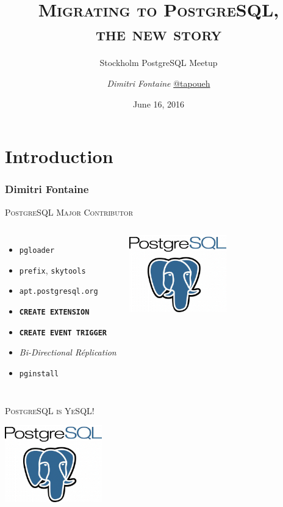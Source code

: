\documentclass{beamer}
\title{\textsc{Migrating to PostgreSQL, \\ the new story}}
\subtitle{Stockholm PostgreSQL Meetup}
\author{\textit{Dimitri Fontaine} \url{@tapoueh}}
\date{June 16, 2016}
\begin{document}
\frame{\titlepage}

\section{Introduction}

\begin{frame}[fragile]
  \frametitle{Dimitri Fontaine}

  \begin{center}
    {\Large \textsc{PostgreSQL Major Contributor}}
  \end{center}

  \begin{columns}[c]

    \begin{itemize}
    \item \texttt{pgloader}
    \item \texttt{prefix}, \texttt{skytools}
    \item \texttt{apt.postgresql.org}
    \item \texttt{\textbf{CREATE EXTENSION}}
    \item \texttt{\textbf{CREATE EVENT TRIGGER}}
    \item \textit{Bi-Directional Réplication}
    \item \texttt{pginstall}
    \end{itemize}  

    \begin{center}
      \includegraphics[height=9em]{postgres-logo.png}
    \end{center}
  \end{columns}
\end{frame}

\begin{frame}
  \begin{center}
    \textsc{\Huge PostgreSQL is YeSQL!}
    \vfill

    \includegraphics[height=9em]{postgres-logo.png}
  \end{center}
\end{frame}
\end{document}
